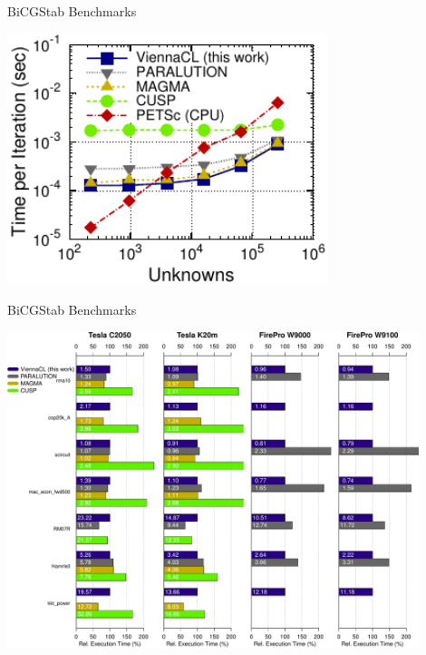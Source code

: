 \begin{frame}[fragile]{BiCGStab Benchmarks}
 \begin{block}{}
 \begin{center}
  \includegraphics[width=0.7\textwidth]{figures/time-laplace2d-K20m-bicgstab}
 \end{center}
 \end{block}   
\end{frame}

\begin{frame}[fragile]{BiCGStab Benchmarks}
 \begin{block}{}
 \begin{center}
  \vspace*{-1cm}
  \includegraphics[width=0.9\textwidth]{figures/bicgstab}
 \end{center}
 \end{block}   
\end{frame}

